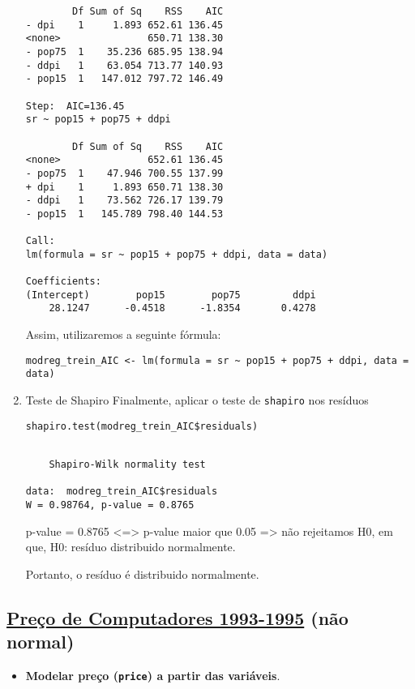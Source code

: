 \documentclass[11pt]{article}
\begin{document}
\begin{enumerate}
\begin{verbatim}
        Df Sum of Sq    RSS    AIC
- dpi    1     1.893 652.61 136.45
<none>               650.71 138.30
- pop75  1    35.236 685.95 138.94
- ddpi   1    63.054 713.77 140.93
- pop15  1   147.012 797.72 146.49

Step:  AIC=136.45
sr ~ pop15 + pop75 + ddpi

        Df Sum of Sq    RSS    AIC
<none>               652.61 136.45
- pop75  1    47.946 700.55 137.99
+ dpi    1     1.893 650.71 138.30
- ddpi   1    73.562 726.17 139.79
- pop15  1   145.789 798.40 144.53

Call:
lm(formula = sr ~ pop15 + pop75 + ddpi, data = data)

Coefficients:
(Intercept)        pop15        pop75         ddpi  
    28.1247      -0.4518      -1.8354       0.4278  

\end{verbatim}

Assim, utilizaremos a seguinte fórmula:
\begin{verbatim}
modreg_trein_AIC <- lm(formula = sr ~ pop15 + pop75 + ddpi, data = data)
\end{verbatim}

\item Teste de Shapiro
\label{sec:orgae6ac8e}
Finalmente, aplicar o teste de \texttt{shapiro} nos resíduos

\begin{verbatim}
shapiro.test(modreg_trein_AIC$residuals)
\end{verbatim}

\begin{verbatim}

	Shapiro-Wilk normality test

data:  modreg_trein_AIC$residuals
W = 0.98764, p-value = 0.8765

\end{verbatim}


p-value = 0.8765 <=> p-value maior que 0.05 => não rejeitamos H0, em que, H0: resíduo distribuido normalmente.

Portanto, o resíduo é distribuido normalmente.
\end{enumerate}

\subsection{\href{https://r-data.pmagunia.com/dataset/r-dataset-package-ecdat-computers}{Preço de Computadores 1993-1995} (não normal)}
\label{sec:orgd161cfa}
\begin{itemize}
\item \textbf{Modelar preço (\texttt{price}) a partir das variáveis}.
\end{itemize}
\end{document}
